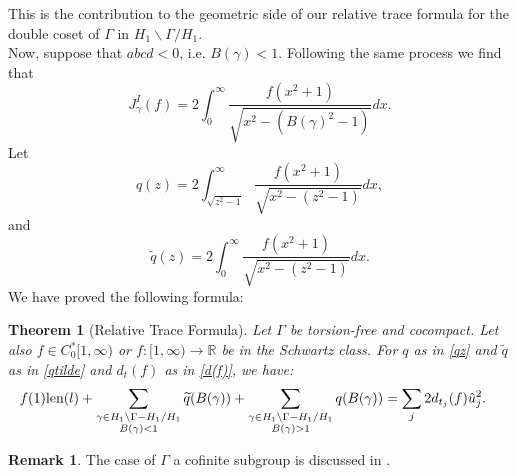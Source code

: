 \documentclass[a4paper,11pt]{amsart}
\newtheorem{theorem}{Theorem}[section]
\theoremstyle{definition}
\newtheorem{remark}{Remark}
\begin{document}
This is the contribution to the geometric side of our relative trace formula for the double coset of $\Gamma$ in $H_1 \backslash \Gamma / H_1$. \\
Now, suppose that $abcd<0$, i.e. $B(\gamma)<1$. Following the same process we find that 
$$ J_{\gamma}^I(f)= 2\int_{0}^{\infty}\frac{f(x^2+1)}{\sqrt{x^2-(B(\gamma)^2-1)}}dx.$$
Let 
\begin{equation}\label{qz}
q(z)= 2\int_{\sqrt{z^2-1}}^{\infty}\frac{f(x^2+1)}{\sqrt{x^2-(z^2-1)}}dx,
\end{equation}
and
\begin{equation}\label{qtilde}
\widetilde{q}(z)=2\int_{0}^{\infty}\frac{f(x^2+1)}{\sqrt{x^2-(z^2-1)}}dx.
\end{equation}
We have proved the following formula:
\begin{theorem}[Relative Trace Formula]\label{traceformula}
Let $\Gamma$ be torsion-free and cocompact. Let also $f \in C_0^{*}[1,\infty)$ or $f:[1, \infty) \to \mathbb{R}$ be in the Schwartz class. For $q$ as in \eqref{qz} and $\widetilde{q}$ as in \eqref{qtilde} and $d_t(f)$ as in \eqref{d(f)}, we have:
\begin{align}
    \begin{split}
        f(1)\hbox{\rm len}(l)&+\sum_{\substack{\gamma \in H_1 \backslash \Gamma -H_1 /H_1 \\ B(\gamma)<1}}\widetilde{q}(B(\gamma))
        +\sum_{\substack{\gamma \in H_1 \backslash \Gamma -H_1 /H_1 \\ B(\gamma)>1}}q(B(\gamma))=\sum_{j}2d_{t_j}(f)\hat{u}_j^2.
    \end{split}
\end{align}
\end{theorem}
\begin{remark}
    The case of $\Gamma$ a cofinite subgroup is discussed in \cite{Voskou}. 
\end{remark}
\end{document}
